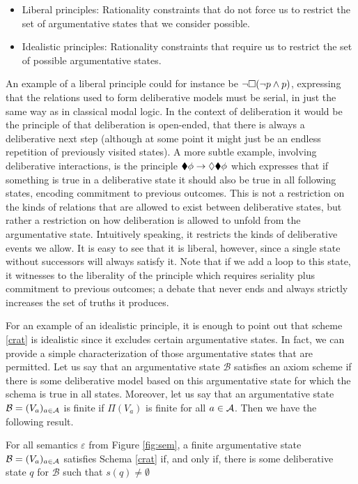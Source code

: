 \documentclass[greybox]{svmult}
\newcommand{\views}{\mathcal B}
\newcommand{\sem}{\varepsilon}
\begin{document}
\begin{itemize}
\item Liberal principles: Rationality constraints that do not force us to restrict the set of argumentative states that we consider possible. 
\item Idealistic principles: Rationality constraints that require us to restrict the set of possible argumentative states.
\end{itemize} 

An example of a liberal principle could for instance be $\neg \square (\neg p \land p)$, expressing that the relations used to form deliberative models must be serial, in just the same way as in classical modal logic. In the context of deliberation it would be the principle of that deliberation is open-ended, that there is always a deliberative next step (although at some point it might just be an endless repetition of previously visited states). A more subtle example, involving deliberative interactions, is the principle $\blacklozenge \phi \to \lozenge \blacklozenge \phi$ which expresses that if something is true in a deliberative state it should also be true in all following states, encoding commitment to previous outcomes. This is not a restriction on the kinds of relations that are allowed to exist between deliberative states, but rather a restriction on how deliberation is allowed to unfold from the argumentative state. Intuitively speaking, it restricts the kinds of deliberative events we allow. It is easy to see that it is liberal, however, since a single state without successors will always satisfy it. Note that if we add a loop to this state, it witnesses to the liberality of the principle which requires seriality plus commitment to previous outcomes; a debate that never ends and always strictly increases the set of truths it produces.

For an example of an idealistic principle, it is enough to point out that scheme \ref{crat} is idealistic since it excludes certain argumentative states. In fact, we can provide a simple characterization of those argumentative states that are permitted. Let us say that an argumentative state $\views$ satisfies an axiom scheme if there is some deliberative model based on this argumentative state for which the schema is true in all states. Moreover, let us say that an argumentative state $\views = (V_a)_{a \in \agents}$ is finite if $\Pi(V_a)$ is finite for all $a \in \mathcal A$. Then we have the following result.

\begin{theorem}\label{thm:1}
For all semantics $\sem$ from Figure \ref{fig:sem}, a finite argumentative state $\views = (V_a)_{a \in \agents}$ satisfies Schema \ref{crat} if, and only if, there is some deliberative state $q$ for $\views$ such that $s(q) \not = \emptyset$
\end{theorem}
\end{document}
